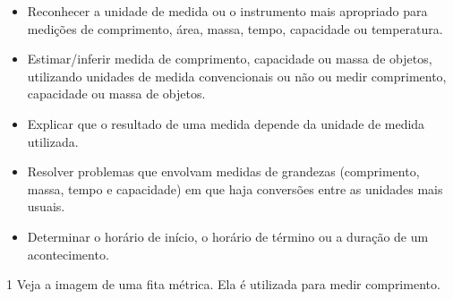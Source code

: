 \begin{itemize}
\item Reconhecer a unidade de medida ou o instrumento mais apropriado para
medições de comprimento, área, massa, tempo, capacidade ou temperatura.

\item Estimar/inferir medida de comprimento, capacidade ou massa de objetos,
utilizando unidades de medida convencionais ou não ou medir comprimento,
capacidade ou massa de objetos.

\item Explicar que o resultado de uma medida depende da unidade de medida
utilizada.

\item Resolver problemas que envolvam medidas de grandezas (comprimento,
massa, tempo e capacidade) em que haja conversões entre as unidades mais
usuais.

\item Determinar o horário de início, o horário de término ou a duração de
um acontecimento.
\end{itemize}




\num{1} Veja a imagem de uma fita métrica. Ela é utilizada para medir comprimento.

